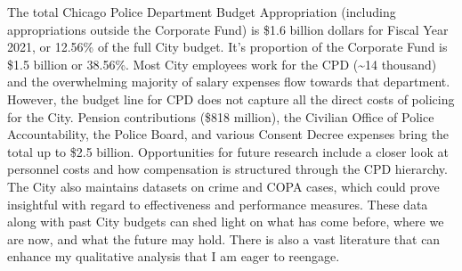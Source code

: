 \documentclass[
]{article}
\begin{document}
The total Chicago Police Department Budget Appropriation (including
appropriations outside the Corporate Fund) is \$1.6 billion dollars for
Fiscal Year 2021, or 12.56\% of the full City budget. It's proportion of
the Corporate Fund is \$1.5 billion or 38.56\%. Most City employees work
for the CPD (\textasciitilde14 thousand) and the overwhelming majority
of salary expenses flow towards that department. However, the budget
line for CPD does not capture all the direct costs of policing for the
City. Pension contributions (\$818 million), the Civilian Office of
Police Accountability, the Police Board, and various Consent Decree
expenses bring the total up to \$2.5 billion.
\setlength{\parindent}{5ex} Opportunities for future research include a
closer look at personnel costs and how compensation is structured
through the CPD hierarchy. The City also maintains datasets on crime and
COPA cases, which could prove insightful with regard to effectiveness
and performance measures. These data along with past City budgets can
shed light on what has come before, where we are now, and what the
future may hold. There is also a vast literature that can enhance my
qualitative analysis that I am eager to reengage.
\end{document}

